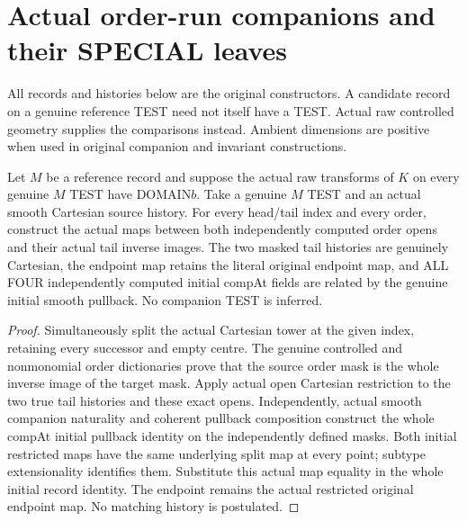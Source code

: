 \section{Actual order-run companions and their SPECIAL leaves}

All records and histories below are the original constructors. A candidate
record on a genuine reference TEST need not itself have a TEST. Actual raw
controlled geometry supplies the comparisons instead. Ambient dimensions are
positive when used in original companion and invariant constructions.

\begin{theorem}
\label{hir:original-modeled-run-companion-actual-masked-cartesian}
\leanok
Let $M$ be a reference record and suppose the actual raw transforms of $K$
on every genuine $M$ TEST have DOMAIN$b$. Take a genuine $M$ TEST and an
actual smooth Cartesian source history. For every head/tail index and every
order, construct the actual maps between both independently computed order
opens and their actual tail inverse images. The two masked tail histories are
genuinely Cartesian, the endpoint map retains the literal original endpoint
map, and ALL FOUR independently computed initial compAt fields are related by
the genuine initial smooth pullback. No companion TEST is inferred.
\end{theorem}
\begin{proof}
Simultaneously split the actual Cartesian tower at the given index, retaining
every successor and empty centre. The genuine controlled and nonmonomial
order dictionaries prove that the source order mask is the whole inverse
image of the target mask. Apply actual open Cartesian restriction to the two
true tail histories and these exact opens. Independently, actual smooth
companion naturality and coherent pullback composition construct the whole
compAt initial pullback identity on the independently defined masks. Both
initial restricted maps have the same underlying split map at every point;
subtype extensionality identifies them. Substitute this actual map equality
in the whole initial record identity. The endpoint remains the actual
restricted original endpoint map. No matching history is postulated.
\end{proof}

